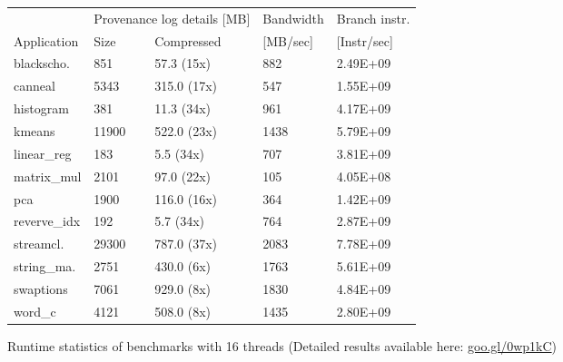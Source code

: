 \begin{figure}[t]
\centering
\myfontsize
{
\begin{tabular}{m{1cm}|m{1cm}|m{1.4cm}|m{1.25cm}|m{1.25cm}}
       & \multicolumn{2}{c|}{ Provenance log details [MB] }   &  Bandwidth & Branch instr. \\
   { Application} & Size & Compressed & [MB/sec] &  [Instr/sec] \\
  \hline \hline
    blackscho.& 851& 57.3 (15x)& 882& 2.49E+09 \\
    canneal& 5343& 315.0 (17x)& 547& 1.55E+09 \\
    histogram& 381& 11.3 (34x)& 961& 4.17E+09 \\
    kmeans& 11900& 522.0 (23x)& 1438& 5.79E+09 \\
    linear\_reg& 183& 5.5 (34x)& 707& 3.81E+09 \\
    matrix\_mul& 2101& 97.0 (22x)& 105& 4.05E+08 \\
    pca& 1900& 116.0 (16x)& 364& 1.42E+09 \\
    reverve\_idx& 192& 5.7 (34x)& 764& 2.87E+09 \\
    streamcl.& 29300& 787.0 (37x)& 2083& 7.78E+09 \\
    string\_ma.& 2751& 430.0 (6x)& 1763& 5.61E+09 \\
    swaptions& 7061& 929.0 (8x)& 1830& 4.84E+09 \\
    word\_c& 4121& 508.0 (8x)& 1435& 2.80E+09 \\

\hline
\end{tabular}
}

\caption{Runtime statistics of benchmarks with 16 threads (Detailed results available here: \href{https://goo.gl/0wp1kC}{goo.gl/0wp1kC}) }                                                                                                                                      \label{tab:apps}
\end{figure}
